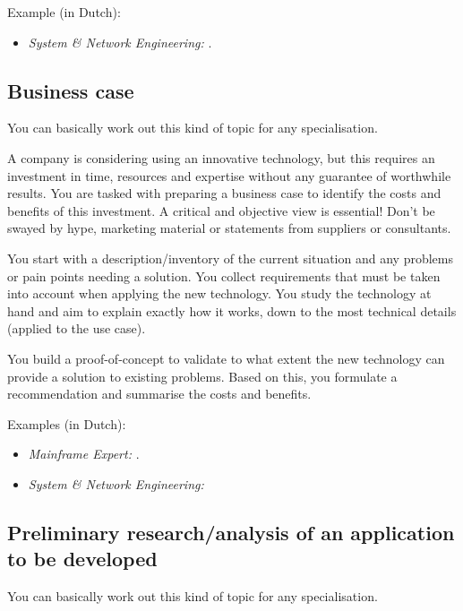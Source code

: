 Example (in Dutch):

\begin{itemize}
	\item \emph{System \& Network Engineering:}  \autocite{VanDamme2021}.
\end{itemize}

\subsection{Business case}%
\label{ssec:thesis_type_business_case}

You can basically work out this kind of topic for any specialisation.

A company is considering using an innovative technology, but this requires an investment in time, resources and expertise without any guarantee of worthwhile results. You are tasked with preparing a business case to identify the costs and benefits of this investment. A critical and objective view is essential! Don't be swayed by hype, marketing material or statements from suppliers or consultants.

You start with a description/inventory of the current situation and any problems or pain points needing a solution. You collect requirements that must be taken into account when applying the new technology. You study the technology  at hand and aim to explain exactly how it works, down to the most technical details (applied to the use case).

You build a proof-of-concept to validate to what extent the new technology can provide a solution to existing problems. Based on this, you formulate a recommendation and summarise the costs and benefits.

Examples (in Dutch):

\begin{itemize}
	\item \emph{Mainframe Expert:}  \autocite{Coucke2020}.
	\item \emph{System \& Network Engineering:}  \autocite{Vanduynslager2024}
\end{itemize}

\subsection{Preliminary research/analysis of an application to be developed}%
\label{ssec:thesis_type_application_analysis}

You can basically work out this kind of topic for any specialisation.

